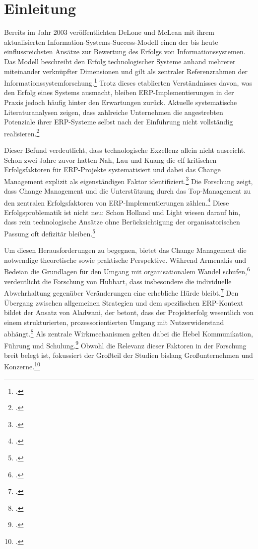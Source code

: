 \section{Einleitung}

Bereits im Jahr 2003 veröffentlichten DeLone und McLean mit ihrem aktualisierten Information-Systems-Success-Modell einen der bis heute einflussreichsten Ansätze zur Bewertung des Erfolgs von Informationssystemen. Das Modell beschreibt den Erfolg technologischer Systeme anhand mehrerer miteinander verknüpfter Dimensionen und gilt als zentraler Referenzrahmen der Informationssystemforschung.\footcite[Vgl.][S.~9--10]{delone2003} Trotz dieses etablierten Verständnisses davon, was den Erfolg eines Systems ausmacht, bleiben ERP-Implementierungen in der Praxis jedoch häufig hinter den Erwartungen zurück. Aktuelle systematische Literaturanalysen zeigen, dass zahlreiche Unternehmen die angestrebten Potenziale ihrer ERP-Systeme selbst nach der Einführung nicht vollständig realisieren.\footcite[Vgl.][S.~2--3]{butarbutar2023}

Dieser Befund verdeutlicht, dass technologische Exzellenz allein nicht ausreicht. Schon zwei Jahre zuvor hatten Nah, Lau und Kuang die elf kritischen Erfolgsfaktoren für ERP-Projekte systematisiert und dabei das Change Management explizit als eigenständigen Faktor identifiziert.\footcite[Vgl.][S.~285]{nah2001} Die Forschung zeigt, dass Change Management und die Unterstützung durch das Top-Management zu den zentralen Erfolgsfaktoren von ERP-Implementierungen zählen.\footcites[Vgl.][S.~1181--1190]{leyh2014}[][S.~258--259]{somers2004} Diese Erfolgsproblematik ist nicht neu: Schon Holland und Light wiesen darauf hin, dass rein technologische Ansätze ohne Berücksichtigung der organisatorischen Passung oft defizitär bleiben.\footcite[Vgl.][S.~30--36]{holland1999}

Um diesen Herausforderungen zu begegnen, bietet das Change Management die notwendige theoretische sowie praktische Perspektive. Während Armenakis und Bedeian die Grundlagen für den Umgang mit organisationalem Wandel schufen,\footcite[Vgl.][S.~300--302]{armenakis1999} verdeutlicht die Forschung von Hubbart, dass insbesondere die individuelle Abwehrhaltung gegenüber Veränderungen eine erhebliche Hürde bleibt.\footcite[Vgl.][S.~162]{hubbart2023} Den Übergang zwischen allgemeinen Strategien und dem spezifischen ERP-Kontext bildet der Ansatz von Aladwani, der betont, dass der Projekterfolg wesentlich von einem strukturierten, prozessorientierten Umgang mit Nutzerwiderstand abhängt.\footcite[Vgl.][S.~266--275]{aladwani2001} Als zentrale Wirkmechanismen gelten dabei die Hebel Kommunikation, Führung und Schulung.\footcites[Vgl.][S.~285]{nah2001}[][S.~7--8]{butarbutar2023} Obwohl die Relevanz dieser Faktoren in der Forschung breit belegt ist, fokussiert der Gro\ss{}teil der Studien bislang Gro\ss{}unternehmen und Konzerne.\footcite[Vgl.][S.~3--4]{butarbutar2023}

